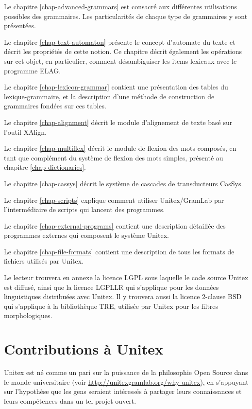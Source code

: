 \bigskip \noindent Le chapitre \ref{chap-advanced-grammars} est consacré aux différentes
utilisations possibles des grammaires. Les particularités de chaque type de grammaires y sont
présentées.

\bigskip \noindent Le chapitre \ref{chap-text-automaton} présente le concept d'automate du texte 
et décrit les propriétés de cette notion. Ce chapitre  décrit également les opérations sur cet
objet, en particulier, comment désambiguiser les items lexicaux avec le programme ELAG.

\bigskip \noindent Le chapitre \ref{chap-lexicon-grammar} contient une présentation des tables du
lexique-grammaire, et la description d'une méthode de construction de  grammaires fondées sur ces
tables.

\bigskip \noindent Le chapitre \ref{chap-alignment} décrit le module d'alignement de texte basé sur
l'outil XAlign.

\bigskip \noindent Le chapitre \ref{chap-multiflex} décrit le module de flexion des mots composés,
en tant que complément du système de flexion des mots simples, présenté au chapitre
\ref{chap-dictionaries}.

\bigskip \noindent Le chapitre \ref{chap-cassys} décrit le système de cascades de transducteurs
CasSys.

\bigskip \noindent Le chapitre \ref{chap-scripts} explique comment utiliser Unitex/GramLab
par l'intermédiaire de scripts qui lancent des programmes.

\bigskip \noindent Le chapitre \ref{chap-external-programs} contient une description détaillée des
programmes externes qui composent le système Unitex.

\bigskip \noindent Le chapitre \ref{chap-file-formats} contient une description de tous les formats
de fichiers utilisés par Unitex.


\bigskip \noindent Le lecteur trouvera en annexe la licence LGPL sous  laquelle le code source
Unitex est diffusé, ainsi que la licence LGPLLR qui s'applique pour les données linguistiques
distribuées avec Unitex. Il y trouvera aussi la licence 2-clause BSD qui s'applique à la
bibliothèque TRE, utilisée par Unitex pour les filtres morphologiques.

\clearpage

\section*{Contributions à Unitex}
Unitex est né comme un pari sur la puissance de la philosophie Open Source dans le monde
universitaire (voir \url{http://unitexgramlab.org/why-unitex}), en s'appuyant sur l'hypothèse que les gens seraient intéressés à partager leurs connaissances et leurs compétences dans un tel projet ouvert.

